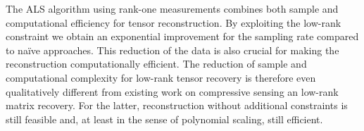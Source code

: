 The ALS algorithm using rank-one measurements combines both sample and computational efficiency for tensor reconstruction.
By exploiting the low-rank constraint we obtain an exponential improvement for the sampling rate compared to na\"ive approaches.
This reduction of the data is also crucial for making the reconstruction computationally efficient.
The reduction of sample and computational complexity for low-rank tensor recovery is therefore even qualitatively different from existing work on compressive sensing an low-rank matrix recovery.
For the latter, reconstruction without additional constraints is still feasible and, at least in the sense of polynomial scaling, still efficient.
